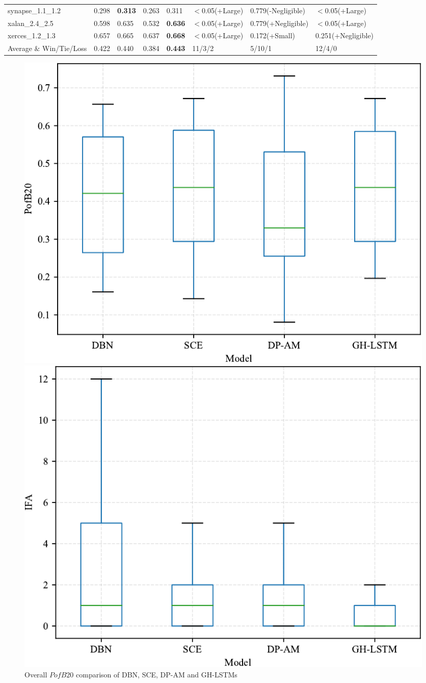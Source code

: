 \documentclass[journal]{IEEEtran}
\begin{document}
\begin{table}[htbp]
\begin{tabular}{m{2cm}|llll|lll}
		synapse\_1.1\_1.2 &0.298     &\textbf{0.313}&0.263     &0.311     &$<$0.05(+Large)&0.779(-Negligible)&$<$0.05(+Large)\\
		xalan\_2.4\_2.5   &0.598     &0.635     &0.532     &\textbf{0.636}&$<$0.05(+Large)&0.779(+Negligible)&$<$0.05(+Large)\\
		xerces\_1.2\_1.3  &0.657     &0.665     &0.637     &\textbf{0.668}&$<$0.05(+Large)&0.172(+Small)&0.251(+Negligible)\\\midrule
		Average $\&$ Win/Tie/Loss&0.422&0.440&0.384&\textbf{0.443}&11/3/2&5/10/1&12/4/0\\
		\bottomrule
	\end{tabular}
\end{table}

\begin{figure}
\centering
\begin{minipage}[b]{.45\textwidth}
\includegraphics[scale=0.6]{figs/box_PofB20.pdf}
\caption{Overall $PofB20$ comparison of DBN, SCE, DP-AM and GH-LSTMs}
\label{fig_box_PofB20}
\end{minipage}\qquad
\begin{minipage}[b]{.45\textwidth}
\includegraphics[scale=0.6]{figs/box_IFA.pdf}

\end{minipage}
\end{figure}
\end{document}
